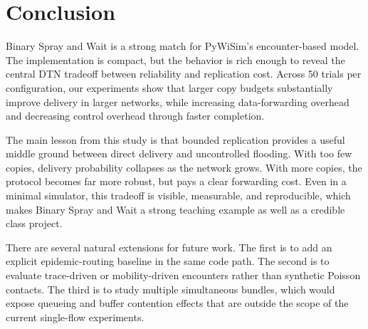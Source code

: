 \section{Conclusion}

Binary Spray and Wait is a strong match for PyWiSim's encounter-based model. The implementation is compact, but the behavior is rich enough to reveal the central DTN tradeoff between reliability and replication cost. Across 50 trials per configuration, our experiments show that larger copy budgets substantially improve delivery in larger networks, while increasing data-forwarding overhead and decreasing control overhead through faster completion.

The main lesson from this study is that bounded replication provides a useful middle ground between direct delivery and uncontrolled flooding. With too few copies, delivery probability collapses as the network grows. With more copies, the protocol becomes far more robust, but pays a clear forwarding cost. Even in a minimal simulator, this tradeoff is visible, measurable, and reproducible, which makes Binary Spray and Wait a strong teaching example as well as a credible class project.

There are several natural extensions for future work. The first is to add an explicit epidemic-routing baseline in the same code path. The second is to evaluate trace-driven or mobility-driven encounters rather than synthetic Poisson contacts. The third is to study multiple simultaneous bundles, which would expose queueing and buffer contention effects that are outside the scope of the current single-flow experiments.
